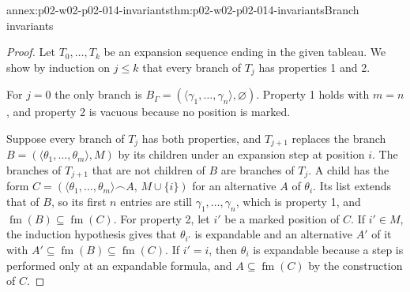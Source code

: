\begin{annexitem}{annex:p02-w02-p02-014-invariants}{thm:p02-w02-p02-014-invariants}{Branch invariants}
\begin{proof}
Let \(T_0,\ldots,T_k\) be an expansion sequence ending in the given tableau.
We show by induction on \(j\leq k\) that every branch of \(T_j\) has
properties 1 and 2.

For \(j=0\) the only branch is \(B_\Gamma=(\langle\gamma_1,\ldots,
\gamma_n\rangle,\varnothing)\).  Property 1 holds with \(m=n\), and property 2
is vacuous because no position is marked.

Suppose every branch of \(T_j\) has both properties, and \(T_{j+1}\) replaces
the branch \(B=(\langle\theta_1,\ldots,\theta_m\rangle,M)\) by its children
under an expansion step at position \(i\).  The branches of \(T_{j+1}\) that
are not children of \(B\) are branches of \(T_j\).  A child has the form
\(C=(\langle\theta_1,\ldots,\theta_m\rangle\frown A,\,M\cup\{i\})\) for an
alternative \(A\) of \(\theta_i\).  Its list extends that of \(B\), so its
first \(n\) entries are still \(\gamma_1,\ldots,\gamma_n\), which is
property 1, and \(\operatorname{fm}(B)\subseteq\operatorname{fm}(C)\).  For property 2, let \(i'\) be a marked
position of \(C\).  If \(i'\in M\), the induction hypothesis gives that
\(\theta_{i'}\) is expandable and an alternative \(A'\) of it with
\(A'\subseteq\operatorname{fm}(B)\subseteq\operatorname{fm}(C)\).  If \(i'=i\), then \(\theta_i\) is expandable
because a step is performed only at an expandable formula, and
\(A\subseteq\operatorname{fm}(C)\) by the construction of \(C\).
\end{proof}
\end{annexitem}

